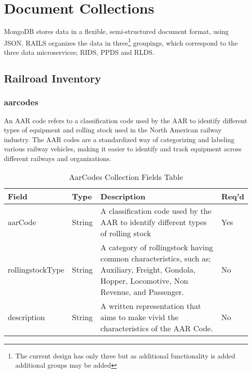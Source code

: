 \section{Document Collections}
MongoDB stores data in a flexible, semi-structured document format, using JSON. \ac{RAILS} organizes the data in three\footnote{The current design has only three but as additional functionality is added additional groups may be added} groupings, which correspond to the three data microservices; \ac{RIDS}, \ac{PPDS} and \ac{RLDS}.
\subsection{Railroad Inventory}
\subsubsection{aarcodes}\label{aarcode}
An \ac{AAR} code refers to a classification code used by the \ac{AAR} to identify different types of equipment and rolling stock used in the North American railway industry. The AAR codes are a standardized way of categorizing and labeling various railway vehicles, making it easier to identify and track equipment across different railways and organizations.
\begin{table}[H]
    \begin{tabular}{|L{3cm}|L{1.7cm}|L{8.8cm}|L{1.3cm}|}
    \hline
        \textbf{Field} & \textbf{Type} & \textbf{Description} & \textbf{Req'd} \\ \hline
        aarCode & String & A classification code used by the \ac{AAR} to identify different types of rolling stock & Yes \\ \hline
        rollingstockType & String & A category of rollingstock having common characteristics, such as; Auxiliary, Freight, Gondola, Hopper, Locomotive, Non Revenue, and Passenger. & No\\ \hline
        description & String & A written representation that aims to make vivid the characteristics of the AAR Code. & No \\ \hline
    \end{tabular}
    \caption{\label{aarcode-table}AarCodes Collection Fields Table}
    \end{table}
